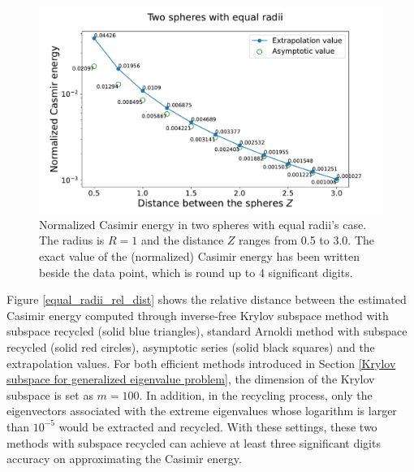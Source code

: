 \begin{figure}[H]
    \centering
    \includegraphics[scale = 0.5]{figures/Spheres_equal_CasE.pdf}
    \caption[Caption for LOF]{Normalized Casimir energy \protect\footnotemark in two spheres with equal radii's case. The radius is $R = 1$ and the distance $Z$ 
    ranges from 0.5 to 3.0. The exact value of the (normalized) Casimir energy has been written beside the data point, which is round up to 4 significant digits.}
    \label{Casimir energy between spheres with equal radii}
\end{figure}

Figure \ref{equal_radii_rel_dist} shows the relative distance between the estimated Casimir energy computed through inverse-free Krylov subspace method with subspace 
recycled (solid blue triangles), standard Arnoldi method with subspace recycled (solid red circles), asymptotic series (solid black squares) and the extrapolation values.
For both efficient methods introduced in Section \ref{Krylov subspace for generalized eigenvalue problem}, the dimension of the Krylov subspace is set as $m = 100$. 
In addition, in the recycling process, only the eigenvectors associated with the extreme eigenvalues whose logarithm is larger than $10^{-5}$
would be extracted and recycled. With these settings, these two methods with subspace recycled can achieve at least three significant digits accuracy on 
approximating the Casimir energy.

